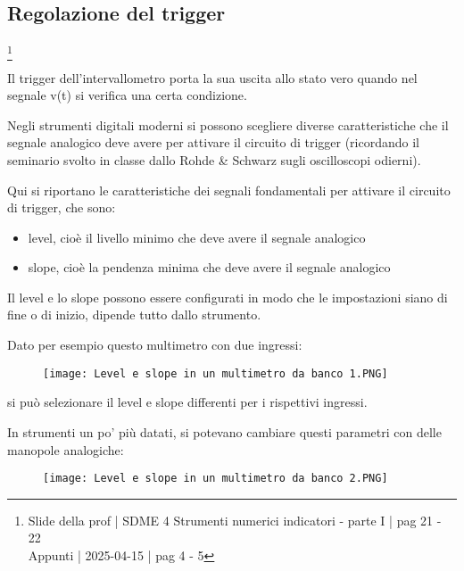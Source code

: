 \newpage 

\subsection{Regolazione del trigger}
\footnote{Slide della prof | SDME 4 Strumenti numerici indicatori - parte I | pag 21 - 22 \\  
Appunti | 2025-04-15 | pag 4 - 5}

Il trigger dell'intervallometro porta la sua uscita allo stato vero quando nel segnale v(t) si verifica una certa condizione. \newline 

Negli strumenti digitali moderni si possono scegliere diverse caratteristiche che il segnale analogico deve avere per attivare il circuito di trigger 
(ricordando il seminario svolto in classe dallo Rohde \& Schwarz sugli oscilloscopi odierni). \newline 

Qui si riportano le caratteristiche dei segnali fondamentali per attivare il circuito di trigger, che sono: 

\begin{itemize}
    \item level, cioè il livello minimo che deve avere il segnale analogico
    \item slope, cioè la pendenza minima che deve avere il segnale analogico
\end{itemize}

Il level e lo slope possono essere configurati in modo che le impostazioni siano di fine o di inizio, dipende tutto dallo strumento. \newline 

Dato per esempio questo multimetro con due ingressi: 

\begin{figure}[h]
    \centering
    \texttt{[image: Level e slope in un multimetro da banco 1.PNG]}
\end{figure} 

si può selezionare il level e slope differenti per i rispettivi ingressi. \newline 

In strumenti un po' più datati, si potevano cambiare questi parametri con delle manopole analogiche: 

\begin{figure}[h]
    \centering
    \texttt{[image: Level e slope in un multimetro da banco 2.PNG]}
\end{figure} 

